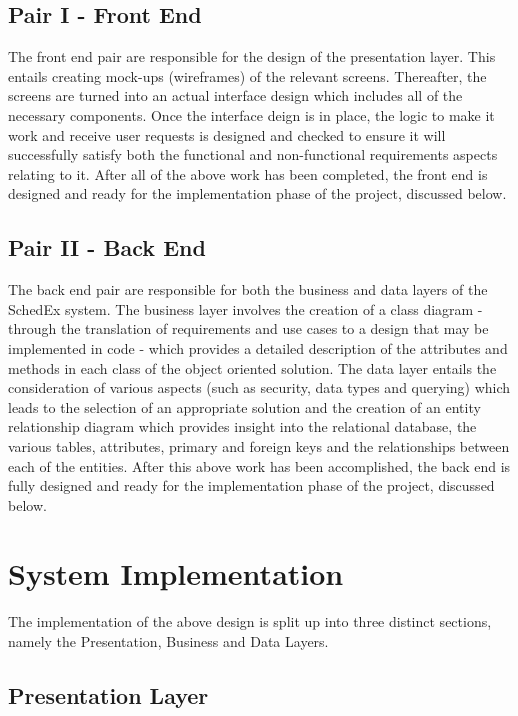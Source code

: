 \documentclass{article}
\begin{document}
\subsection{Pair I - Front End}

The front end pair are responsible for the design of the presentation layer. This entails creating mock-ups (wireframes) of the relevant screens. Thereafter, the screens are turned into an actual interface design which includes all of the necessary components. Once the interface deign is in place, the logic to make it work and receive user requests is designed and checked to ensure it will successfully satisfy both the functional and non-functional requirements aspects relating to it. After all of the above work has been completed, the front end is designed and ready for the implementation phase of the project, discussed below.

\subsection{Pair II - Back End}

The back end pair are responsible for both the business and data layers of the SchedEx system. The business layer involves the creation of a class diagram - through the translation of requirements and use cases to a design that may be implemented in code - which provides a detailed description of the attributes and methods in each class of the object oriented solution. The data layer entails the consideration of various aspects (such as security, data types and querying) which leads to the selection of an appropriate solution and the creation of an entity relationship diagram which provides insight into the relational database, the various tables, attributes, primary and foreign keys and the relationships between each of the entities. After this above work has been accomplished, the back end is fully designed and ready for the implementation phase of the project, discussed below.

\section{System Implementation}
The implementation of the above design is split up into three distinct sections, namely the Presentation,
Business and Data Layers.

\subsection{Presentation Layer}
\end{document}

